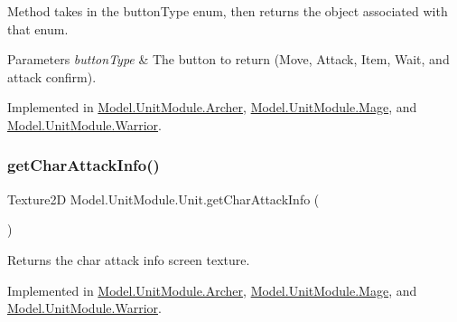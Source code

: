 Method takes in the button\+Type enum, then returns the object associated with that enum. 
\begin{DoxyParams}{Parameters}
{\em button\+Type} & The button to return (Move, Attack, Item, Wait, and attack confirm). \\
\hline
\end{DoxyParams}


Implemented in \hyperlink{class_model_1_1_unit_module_1_1_archer_af4d544ecd34e57d071a129fb7d0f155d}{Model.\+Unit\+Module.\+Archer}, \hyperlink{class_model_1_1_unit_module_1_1_mage_a996253aeeb97c7a5d64ad81c03adf0f0}{Model.\+Unit\+Module.\+Mage}, and \hyperlink{class_model_1_1_unit_module_1_1_warrior_ab0bfca3f6dc3b86e966afb7e9ef8cead}{Model.\+Unit\+Module.\+Warrior}.

\hypertarget{interface_model_1_1_unit_module_1_1_unit_a7c89d9a1dc648b556b7e57cdcdbf2930}{}\label{interface_model_1_1_unit_module_1_1_unit_a7c89d9a1dc648b556b7e57cdcdbf2930} 
\subsubsection{\texorpdfstring{get\+Char\+Attack\+Info()}{getCharAttackInfo()}}
{\footnotesize\ttfamily Texture2D Model.\+Unit\+Module.\+Unit.\+get\+Char\+Attack\+Info (\begin{DoxyParamCaption}{ }\end{DoxyParamCaption})}

Returns the char attack info screen texture. 

Implemented in \hyperlink{class_model_1_1_unit_module_1_1_archer_aafb7e46f581d1710a16d054dfef03ddf}{Model.\+Unit\+Module.\+Archer}, \hyperlink{class_model_1_1_unit_module_1_1_mage_a69d22e6d54e3f0d7f3cf8b1029755ffe}{Model.\+Unit\+Module.\+Mage}, and \hyperlink{class_model_1_1_unit_module_1_1_warrior_a6774680a84b9fea3ac5e95f0fc8ad9a7}{Model.\+Unit\+Module.\+Warrior}.

\hypertarget{interface_model_1_1_unit_module_1_1_unit_a4e2aeae552d85c8938e609729bcd1a44}{}\label{interface_model_1_1_unit_module_1_1_unit_a4e2aeae552d85c8938e609729bcd1a44} 
